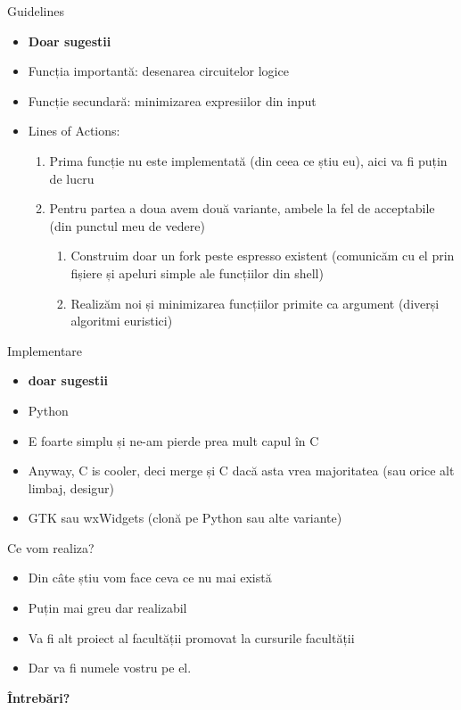 \documentclass{beamer}
\begin{document}
\begin{frame}{Guidelines}
\begin{itemize}
\item \textbf{Doar sugestii}
\item Funcția importantă: desenarea circuitelor logice
\item \pause Funcție secundară: minimizarea expresiilor din input
\item \pause Lines of Actions:
\begin{enumerate}
\item \pause Prima funcție nu este implementată (din ceea ce știu eu), aici va fi puțin de lucru
\item \pause Pentru partea a doua avem două variante, ambele la fel de acceptabile (din punctul meu de vedere)
\begin{enumerate}
\item \pause Construim doar un fork peste espresso existent (comunicăm cu el prin fișiere și apeluri simple ale funcțiilor din shell)
\item \pause Realizăm noi și minimizarea funcțiilor primite ca argument (diverși algoritmi euristici)
\end{enumerate}
\end{enumerate}
\end{itemize}
\end{frame}

\begin{frame}{Implementare}
\begin{itemize}
\item \textbf{doar sugestii}
\item \pause Python
\item \pause E foarte simplu și ne-am pierde prea mult capul în C
\item \pause Anyway, C is cooler, deci merge și C dacă asta vrea majoritatea (sau orice alt limbaj, desigur)
\item \pause GTK sau wxWidgets (clonă pe Python sau alte variante)
\end{itemize}
\end{frame}

\begin{frame}{Ce vom realiza?}
\begin{itemize}
\item Din câte știu vom face ceva ce nu mai există
\item \pause Puțin mai greu dar realizabil
\item \pause Va fi alt proiect al facultății promovat la cursurile facultății
\item \pause Dar va fi numele vostru pe el.
\end{itemize}
\end{frame}

\begin{frame}
  \begin{center}
    { \Huge \bf Întrebări? }
  \end{center}
\end{frame}
\end{document}
